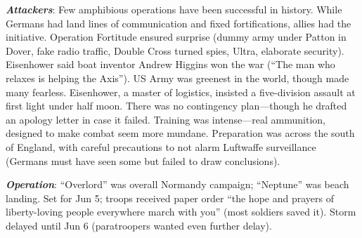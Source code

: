 \documentclass[
]{article}
\begin{document}
\textbf{\emph{Attackers}}: Few amphibious operations have been
successful in history. While Germans had land lines of communication and
fixed fortifications, allies had the initiative. Operation Fortitude
ensured surprise (dummy army under Patton in Dover, fake radio traffic,
Double Cross turned spies, Ultra, elaborate security). Eisenhower said
boat inventor Andrew Higgins won the war (``The man who relaxes is
helping the Axis''). US Army was greenest in the world, though made many
fearless. Eisenhower, a master of logistics, insisted a five-division
assault at first light under half moon. There was no contingency
plan---though he drafted an apology letter in case it failed. Training
was intense---real ammunition, designed to make combat seem more
mundane. Preparation was across the south of England, with careful
precautions to not alarm Luftwaffe surveillance (Germans must have seen
some but failed to draw conclusions).

\textbf{\emph{Operation}}: ``Overlord'' was overall Normandy campaign;
``Neptune'' was beach landing. Set for Jun 5; troops received paper
order ``the hope and prayers of liberty-loving people everywhere march
with you'' (most soldiers saved it). Storm delayed until Jun 6
(paratroopers wanted even further delay).
\end{document}
